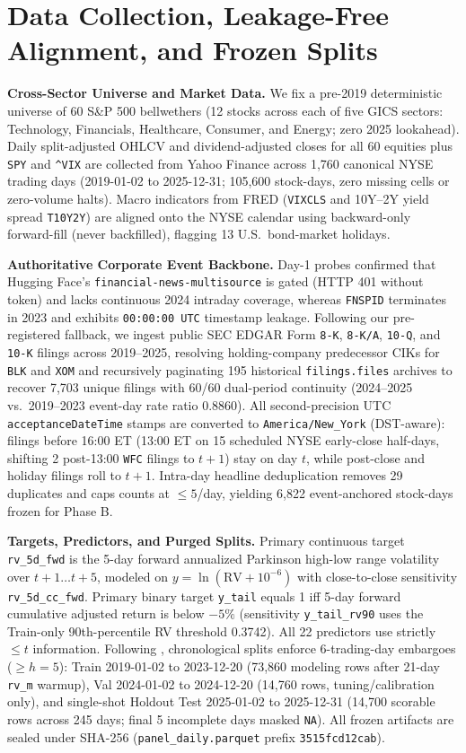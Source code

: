 \documentclass[11pt,a4paper]{article}
\begin{document}
\section{Data Collection, Leakage-Free Alignment, and Frozen Splits}

\textbf{Cross-Sector Universe and Market Data.} We fix a pre-2019
deterministic universe of 60 S\&P 500 bellwethers (12 stocks across
each of five GICS sectors: Technology, Financials, Healthcare, Consumer, and
Energy; zero 2025 lookahead). Daily split-adjusted OHLCV and dividend-adjusted
closes for all 60 equities plus \texttt{SPY} and
\texttt{\^{}VIX} are collected from Yahoo Finance across 1,760
canonical NYSE trading days (2019-01-02 to 2025-12-31; 105,600
stock-days, zero missing cells or zero-volume halts). Macro indicators from FRED
(\texttt{VIXCLS} and 10Y--2Y yield spread \texttt{T10Y2Y}) are aligned onto
the NYSE calendar using backward-only forward-fill (never backfilled), flagging
13 U.S.\ bond-market holidays.

\textbf{Authoritative Corporate Event Backbone.} Day-1 probes confirmed that
Hugging Face's \texttt{financial-news-multisource} is gated (HTTP 401 without
token) and lacks continuous 2024 intraday coverage, whereas \texttt{FNSPID}
terminates in 2023 and exhibits \texttt{00:00:00 UTC} timestamp leakage.
Following our pre-registered fallback, we ingest public SEC EDGAR Form
\texttt{8-K}, \texttt{8-K/A}, \texttt{10-Q}, and \texttt{10-K} filings
across 2019--2025, resolving holding-company predecessor CIKs for \texttt{BLK}
and \texttt{XOM} and recursively paginating 195 historical
\texttt{filings.files} archives to recover 7,703 unique
filings with 60/60 dual-period continuity (2024--2025 vs.\ 2019--2023 event-day
rate ratio 0.8860). All second-precision UTC
\texttt{acceptanceDateTime} stamps are converted to \texttt{America/New\_York}
(DST-aware): filings before 16:00 ET (13:00 ET on 15 scheduled NYSE early-close
half-days, shifting 2 post-13:00 \texttt{WFC} filings
to $t+1$) stay on day $t$, while post-close and holiday filings roll to $t+1$.
Intra-day headline deduplication removes 29 duplicates and
caps counts at $\le 5$/day, yielding 6,822 event-anchored
stock-days frozen for Phase B.

\textbf{Targets, Predictors, and Purged Splits.} Primary continuous target
\texttt{rv\_5d\_fwd} is the 5-day forward annualized Parkinson high-low range
volatility~\cite{parkinson1980} over $t+1\dots t+5$, modeled on
$y = \ln(\text{RV} + 10^{-6})$ with close-to-close sensitivity
\texttt{rv\_5d\_cc\_fwd}. Primary binary target \texttt{y\_tail} equals 1
iff 5-day forward cumulative adjusted return is below $-5\%$ (sensitivity
\texttt{y\_tail\_rv90} uses the Train-only 90th-percentile RV threshold
0.3742). All 22 predictors use strictly $\le t$ information.
Following \citet{lopezdeprado2018}, chronological splits enforce 6-trading-day
embargoes ($\ge h=5$): Train 2019-01-02 to 2023-12-20 (73,860
modeling rows after 21-day \texttt{rv\_m} warmup), Val 2024-01-02 to
2024-12-20 (14,760 rows, tuning/calibration only), and single-shot
Holdout Test 2025-01-02 to 2025-12-31 (14,700 scorable rows across
245 days; final 5 incomplete days masked \texttt{NA}). All frozen
artifacts are sealed under SHA-256 (\texttt{panel\_daily.parquet} prefix
\texttt{3515fcd12cab}).
\end{document}
